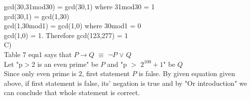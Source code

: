 \documentclass[12pt]{article}
\begin{document}
gcd(30,31mod30) = gcd(30,1) where 31mod30 = 1\\

gcd(30,1) = gcd(1,30)\\

gcd(1,30mod1) = gcd(1,0) where 30mod1 = 0\\

gcd(1,0) = 1. Therefore gcd(123,277) = 1\\
C)\\

Table 7 eqn1 says that $P$$\rightarrow$$Q$ $\equiv$ $\neg$$P$ $\lor$ $Q$\\

Let "p$>$2 is an even prime" be  $P$ and "p $>$ $2^{100}+1$" be $Q$\\

Since only even prime is $2$, first statement $P$ is false. By given equation given above, if first statement is false, its' negation is true and by "Or introduction" we can conclude that whole statement is correct.
\end{document}
